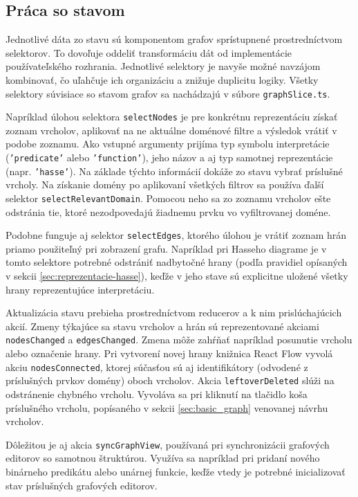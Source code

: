 \subsection{Práca so stavom}
Jednotlivé dáta zo stavu sú komponentom grafov sprístupnené prostredníctvom selektorov. To dovoľuje oddeliť transformáciu dát od implementácie používateľského rozhrania. Jednotlivé selektory je navyše možné navzájom kombinovať, čo uľahčuje ich organizáciu a znižuje duplicitu logiky. Všetky selektory súvisiace so stavom grafov sa nachádzajú v súbore \texttt{graphSlice.ts}.

Napríklad úlohou selektora \texttt{selectNodes} je pre konkrétnu reprezentáciu získať zoznam vrcholov, aplikovať na ne aktuálne doménové filtre a výsledok vrátiť v podobe zoznamu. Ako vstupné argumenty prijíma typ symbolu interpretácie (\texttt{'predicate'} alebo \texttt{'function'}), jeho názov a aj typ samotnej reprezentácie (napr. \texttt{'hasse'}). Na základe týchto informácií dokáže zo stavu vybrať príslušné vrcholy. Na získanie domény po aplikovaní všetkých filtrov sa používa ďalší selektor \texttt{selectRelevantDomain}. Pomocou neho sa zo zoznamu vrcholov ešte odstránia tie, ktoré nezodpovedajú žiadnemu prvku vo vyfiltrovanej doméne.


Podobne funguje aj selektor \texttt{selectEdges}, ktorého úlohou je vrátiť zoznam hrán priamo použiteľný pri zobrazení grafu. Napríklad pri Hasseho diagrame je v tomto selektore potrebné odstrániť nadbytočné hrany (podľa pravidiel opísaných v sekcii \ref{sec:reprezentacie-hasse}), keďže v jeho stave sú explicitne uložené všetky hrany reprezentujúce interpretáciu.

Aktualizácia stavu prebieha prostredníctvom reducerov a k nim prislúchajúcich akcií. Zmeny týkajúce sa stavu vrcholov a hrán sú reprezentované akciami \texttt{nodesChanged} a \texttt{edgesChanged}. Zmena môže zahŕňať napríklad posunutie vrcholu alebo označenie hrany. Pri vytvorení novej hrany knižnica React Flow vyvolá akciu \texttt{nodesConnected}, ktorej súčasťou sú aj identifikátory (odvodené z príslušných prvkov domény) oboch vrcholov. Akcia \texttt{leftoverDeleted} slúži na odstránenie chybného vrcholu. Vyvoláva sa pri kliknutí na tlačidlo koša príslušného vrcholu, popísaného v sekcii \ref{sec:basic_graph} venovanej návrhu vrcholov.

Dôležitou je aj akcia \texttt{syncGraphView}, používaná pri synchronizácii grafových editorov so samotnou štruktúrou. Využíva sa napríklad pri pridaní nového binárneho predikátu alebo unárnej funkcie, keďže vtedy je potrebné inicializovať stav príslušných grafových editorov.


